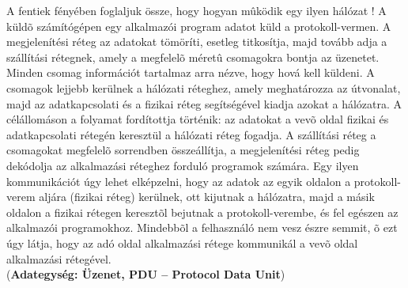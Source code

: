 A fentiek fényében foglaljuk össze, hogy hogyan mûködik egy ilyen hálózat ! A küldõ számítógépen egy alkalmazói program adatot küld a protokoll-vermen. A megjelenítési réteg az adatokat tömöríti, esetleg titkosítja, majd tovább adja a szállítási rétegnek, amely a megfelelõ méretû csomagokra bontja az üzenetet. Minden csomag információt tartalmaz arra nézve, hogy hová kell küldeni. A csomagok lejjebb kerülnek a hálózati réteghez, amely meghatározza az útvonalat, majd az adatkapcsolati és a fizikai réteg segítségével kiadja azokat a hálózatra. A célállomáson a folyamat fordítottja történik: az adatokat a vevõ oldal fizikai és adatkapcsolati rétegén keresztül a hálózati réteg fogadja. A szállítási réteg a csomagokat megfelelõ sorrendben összeállítja, a megjelenítési réteg pedig dekódolja az alkalmazási réteghez forduló programok számára. Egy ilyen kommunikációt úgy lehet elképzelni, hogy az adatok az egyik oldalon a protokoll-verem aljára (fizikai réteg) kerülnek, ott kijutnak a hálózatra, majd a másik oldalon a fizikai rétegen keresztõl bejutnak a protokoll-verembe, és fel egészen az alkalmazói programokhoz. Mindebbõl a felhasználó nem vesz észre semmit, õ ezt úgy látja, hogy az adó oldal alkalmazási rétege kommunikál a vevõ oldal alkalmazási rétegével.\\
(\textbf{Adategység: Üzenet, PDU -- Protocol Data Unit})

